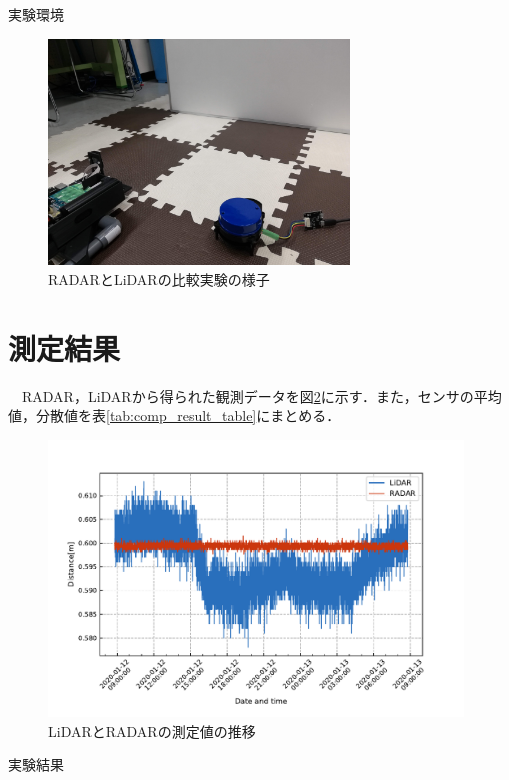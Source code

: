\begin{table}[htbp]
    \centering
    \caption{実験環境}
    
    \label{tab:comp_env_table}
\end{table}

\begin{figure}[H]
    \centering
    \includegraphics[width=8cm]{./fig/comparison_measure_environment.jpg}
    \caption{RADARとLiDARの比較実験の様子}
    \label{fig:comparison_measure_environment}
\end{figure}

\section{測定結果}
　RADAR，LiDARから得られた観測データを図\ref{fig:comparison_raw}に示す．また，センサの平均値，分散値を表\ref{tab:comp_result_table}にまとめる．
\begin{figure}[H]
    \centering
    \includegraphics[width=11cm]{./fig/comparison_raw.pdf}
    \caption{LiDARとRADARの測定値の推移}
    \label{fig:comparison_raw}
\end{figure}

\begin{table}[htbp]
    \centering
    \caption{実験結果}
    
    \label{tab:comp_result_table}
\end{table}


